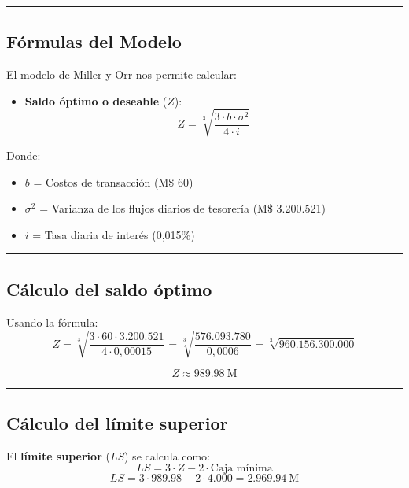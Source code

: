 \documentclass[
  letterpaper,
  DIV=11,
  numbers=noendperiod]{scrartcl}
\providecommand{\tightlist}{%
  \setlength{\itemsep}{0pt}\setlength{\parskip}{0pt}}\usepackage{longtable,booktabs,array}
\begin{document}
\begin{center}\rule{0.5\linewidth}{0.5pt}\end{center}

\subsection{Fórmulas del Modelo}\label{fuxf3rmulas-del-modelo}

El modelo de Miller y Orr nos permite calcular:

\begin{itemize}
\tightlist
\item
  \textbf{Saldo óptimo o deseable} (\(Z\)): \[
  Z = \sqrt[3]{\frac{3 \cdot b \cdot \sigma^2}{4 \cdot i}}
  \]
\end{itemize}

Donde:

\begin{itemize}
\item
  \(b\) = Costos de transacción (M\$ 60)
\item
  \(\sigma^2\) = Varianza de los flujos diarios de tesorería (M\$
  3.200.521)
\item
  \(i\) = Tasa diaria de interés (0,015\%)
\end{itemize}

\begin{center}\rule{0.5\linewidth}{0.5pt}\end{center}

\subsection{Cálculo del saldo
óptimo}\label{cuxe1lculo-del-saldo-uxf3ptimo}

Usando la fórmula: \[
Z = \sqrt[3]{\frac{3 \cdot 60 \cdot 3.200.521}{4 \cdot 0,00015}} = \sqrt[3]{\frac{576.093.780}{0,0006}} = \sqrt[3]{960.156.300.000}
\]

\[
Z \approx 989.98 \ \text{M}
\]

\begin{center}\rule{0.5\linewidth}{0.5pt}\end{center}

\subsection{Cálculo del límite
superior}\label{cuxe1lculo-del-luxedmite-superior}

El \textbf{límite superior} (\(LS\)) se calcula como: \[
LS = 3 \cdot Z - 2 \cdot \text{Caja mínima}
\] \[
LS = 3 \cdot 989.98 - 2 \cdot 4.000 = 2.969.94 \ \text{M}
\]
\end{document}
